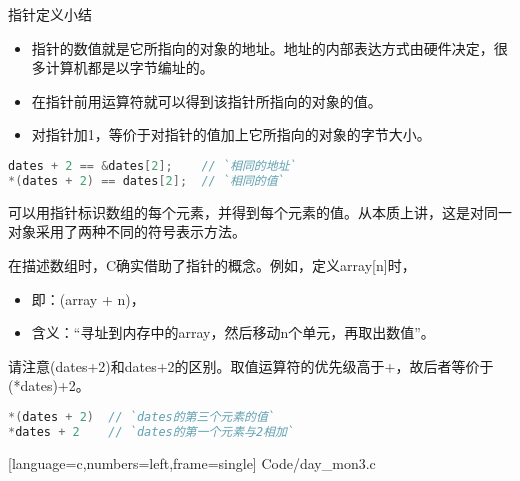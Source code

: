 \begin{frame}[fragile]\ft{\secname}
\begin{center}
\textcolor{acolor1}{\Large 指针定义小结}
\end{center}
\begin{itemize}
\item 
指针的数值就是它所指向的对象的地址。地址的内部表达方式由硬件决定，很多计算机都是以字节编址的。 \\[0.1in]
\item
在指针前用运算符{\tf *}就可以得到该指针所指向的对象的值。\\[0.1in]
\item
对指针加1，等价于对指针的值加上它所指向的对象的字节大小。
\end{itemize}
\end{frame}


\begin{frame}[fragile]\ft{\secname}
\begin{lstlisting}[language=c,backgroundcolor=\color{red!20}]
dates + 2 == &dates[2];    // `相同的地址`
*(dates + 2) == dates[2];  // `相同的值`
\end{lstlisting}

可以用指针标识数组的每个元素，并得到每个元素的值。从本质上讲，这是对同一对象采用了两种不同的符号表示方法。

\end{frame}


\begin{frame}[fragile]\ft{\secname}
在描述数组时，C确实借助了指针的概念。例如，定义{\tf array[n]}时，\vspace{0.1in}

\begin{itemize}
\item
即：{\tf *(array + n)}， \\[0.1in]
\item
含义：“寻址到内存中的{\tf array}，然后移动{\tf n}个单元，再取出数值”。
\end{itemize}
\end{frame}


\begin{frame}[fragile]\ft{\secname}
请注意{\tf *(dates+2)}和{\tf *dates+2}的区别。\textcolor{acolor1}{取值运算符{\tf *}的优先级高于{\tf +}}，故后者等价于{\tf (*dates)+2}。\vspace{0.1in}

\begin{lstlisting}[language=c,backgroundcolor=\color{red!20}]
*(dates + 2)  // `dates的第三个元素的值`
*dates + 2    // `dates的第一个元素与2相加`
\end{lstlisting}
\end{frame}

\begin{frame}[fragile]\ft{\secname}
  
  [language=c,numbers=left,frame=single]  
  {Code/day_mon3.c}
\end{frame}

